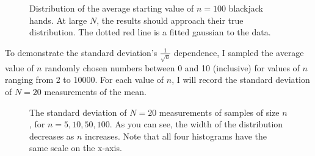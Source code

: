 \documentclass[12pt]{article}
\begin{document}
\begin{figure}[H]
\caption[SODUMB]{Distribution of the average starting value of $n=100$ blackjack hands. At large $N$, the results should approach their true distribution. The dotted red line is a fitted gaussian to the data.}
\label{fig:approachgaussian}
\end{figure}
To demonstrate the standard deviation's $\frac{1}{\sqrt{n}}$ dependence, I sampled the average value of $n$ randomly chosen numbers between 0 and 10 (inclusive) for values of $n$ ranging from 2 to 10000. For each value of $n$, I will record the standard deviation of $N=20$ measurements of the mean.
\begin{figure}[H]
\caption[SODUMB]{The standard deviation of $N=20$ measurements of samples of size $n$, for $n=5,10,50,100$. As you can see, the width of the distribution decreases as $n$ increases. Note that all four histograms have the same scale on the x-axis.}
\label{fig:n_scaling}
\end{figure}
\end{document}
